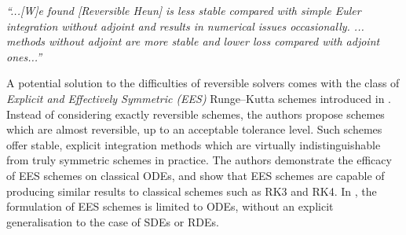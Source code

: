 \documentclass{article}
\theoremstyle{definition}
\theoremstyle{remark}
\begin{document}
\begin{displayquote}
\textit{``...[W]e found [Reversible Heun] is less stable compared with simple Euler integration without adjoint and results in numerical issues occasionally. ... methods without adjoint are more stable and lower loss compared with adjoint ones...''~\citep{zhang2021path}}
\end{displayquote}

A potential solution to the difficulties of reversible solvers comes with the class of \emph{Explicit and Effectively Symmetric (EES)} Runge--Kutta schemes introduced in \cite{shmelev2025explicit}. Instead of considering exactly reversible schemes, the authors propose schemes which are almost reversible, up to an acceptable tolerance level. Such schemes offer stable, explicit integration methods which are virtually indistinguishable from truly symmetric schemes in practice. The authors demonstrate the efficacy of EES schemes on classical ODEs, and show that EES schemes are capable of producing similar results to classical schemes such as RK3 and RK4. In \cite{shmelev2025explicit}, the formulation of EES schemes is limited to ODEs, without an explicit generalisation to the case of SDEs or RDEs. 
\end{document}

